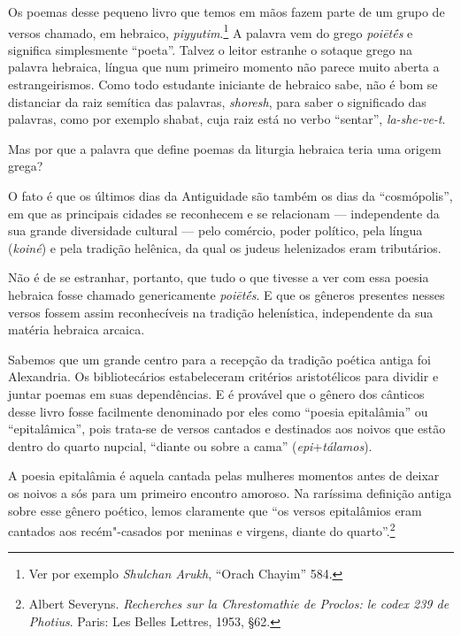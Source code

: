 
\noindent{}Os poemas desse pequeno livro que temos em mãos fazem parte de
um grupo de versos chamado, em hebraico, 
\emph{piyyutim}.\footnote{Ver por exemplo \emph{Shulchan Arukh}, ``Orach Chayim'' 584.}
A palavra vem do grego \emph{poiētḗs} e significa
simplesmente ``poeta''. Talvez o leitor estranhe o sotaque grego
na palavra hebraica, língua que num primeiro momento não parece muito 
aberta a estrangeirismos. Como todo estudante iniciante de hebraico sabe, não é bom se distanciar da
raiz semítica das palavras, \textit{shoresh}, para saber o significado das palavras, como por exemplo shabat, 
cuja raiz está no verbo ``sentar'', \textit{la-she-ve-t}. 

Mas por que a palavra que define poemas da liturgia hebraica teria uma origem grega?

O fato é que os últimos dias da Antiguidade são também os dias da ``cosmópolis'', em que 
as principais cidades se reconhecem e se relacionam --- independente da sua grande diversidade
cultural --- pelo comércio, poder político, pela língua (\textit{koiné}) e pela tradição helênica, 
da qual os judeus helenizados eram tributários. 

Não é de se estranhar, portanto, que tudo o que tivesse a ver com essa poesia hebraica fosse chamado genericamente \emph{poiētḗs}. 
E que os gêneros presentes nesses versos fossem assim reconhecíveis na tradição helenística, independente
da sua matéria hebraica arcaica. 

Sabemos que um grande centro para a recepção da tradição poética antiga foi 
Alexandria. Os bibliotecários estabeleceram critérios aristotélicos para 
dividir e juntar poemas em suas dependências. E é provável que o gênero dos cânticos desse livro fosse facilmente denominado por eles como ``poesia epitalâmia'' ou
``epitalâmica'', pois trata-se de versos cantados e destinados aos noivos que estão dentro do quarto nupcial, 
``diante ou sobre a cama'' (\textit{epi}+\textit{tálamos}).


A poesia epitalâmia é aquela cantada pelas mulheres momentos antes de deixar os noivos a sós para
um primeiro encontro amoroso. Na raríssima definição antiga sobre esse gênero
poético, lemos claramente que ``os versos
epitalâmios eram cantados aos recém"-casados por meninas e virgens,
diante do quarto''.\footnote{Albert Severyns. \emph{Recherches sur la Chrestomathie de Proclos: le codex 239 de Photius}. Paris: Les Belles Lettres, 1953, §62.}

